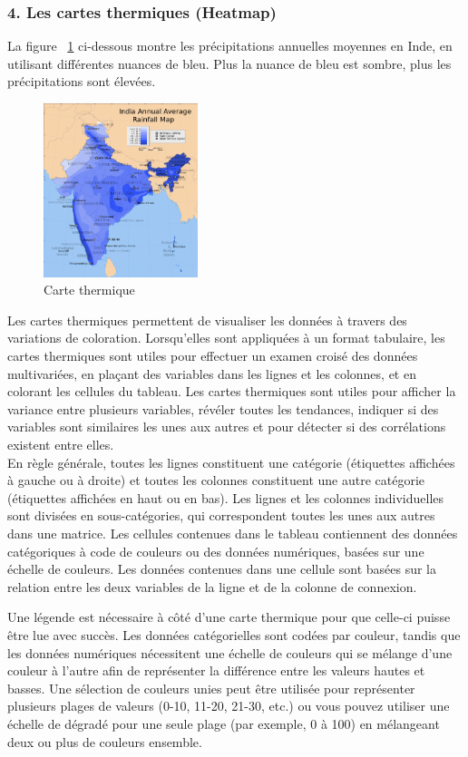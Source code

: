 \documentclass[french, a4paper, 12pt]{report}
\begin{document}
\subsubsection{4. Les cartes thermiques (Heatmap)}
La figure ~\ref{fig:2.11} ci-dessous montre les précipitations annuelles moyennes en Inde, en utilisant différentes nuances de bleu. Plus la nuance de bleu est sombre, plus les précipitations sont élevées.
\begin{figure}
\centering
\includegraphics[width=0.4\textwidth]{images/Heatmap.png}
\caption{\label{fig:2.11} Carte thermique}
\end{figure}
Les cartes thermiques permettent de visualiser les données à travers des variations de coloration. Lorsqu'elles sont appliquées à un format tabulaire, les cartes thermiques sont utiles pour effectuer un examen croisé des données multivariées, en plaçant des variables dans les lignes et les colonnes, et en colorant les cellules du tableau. Les cartes thermiques sont utiles pour afficher la variance entre plusieurs variables, révéler toutes les tendances, indiquer si des variables sont similaires les unes aux autres et pour détecter si des corrélations existent entre elles. \\

En règle générale, toutes les lignes constituent une catégorie (étiquettes affichées à gauche ou à droite) et toutes les colonnes constituent une autre catégorie (étiquettes affichées en haut ou en bas). Les lignes et les colonnes individuelles sont divisées en sous-catégories, qui correspondent toutes les unes aux autres dans une matrice. Les cellules contenues dans le tableau contiennent des données catégoriques à code de couleurs ou des données numériques, basées sur une échelle de couleurs. Les données contenues dans une cellule sont basées sur la relation entre les deux variables de la ligne et de la colonne de connexion.

Une légende est nécessaire à côté d’une carte thermique pour que celle-ci puisse être lue avec succès. Les données catégorielles sont codées par couleur, tandis que les données numériques nécessitent une échelle de couleurs qui se mélange d'une couleur à l'autre afin de représenter la différence entre les valeurs hautes et basses. Une sélection de couleurs unies peut être utilisée pour représenter plusieurs plages de valeurs (0-10, 11-20, 21-30, etc.) ou vous pouvez utiliser une échelle de dégradé pour une seule plage (par exemple, 0 à 100) en mélangeant deux ou plus de couleurs ensemble.
\end{document}
